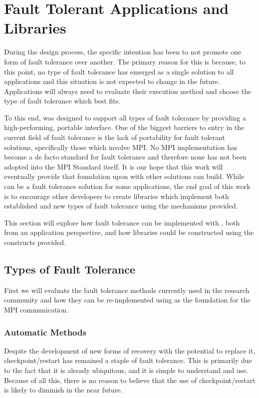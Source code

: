 \chapter{Fault Tolerant Applications and Libraries}
\label{chap:apps}

During the \ulfm design process, the specific intention has been to not promote 
one form of fault tolerance over another. The primary reason for this is because, to 
this point, no type of fault tolerance has emerged as a single solution to all 
applications and this situation is not expected to change in the future. Applications 
will always need to evaluate their execution method and choose the type of fault 
tolerance which best fits.

To this end, \ulfm was designed to support all types of fault tolerance by 
providing a high-performing, portable interface. One of the biggest barriers to 
entry in the current field of fault tolerance is the lack of portability for 
fault tolerant solutions, specifically those which involve MPI. No MPI 
implementation has become a de facto standard for fault tolerance and therefore 
none has not been adopted into the MPI Standard itself. It is our hope that this work 
will eventually provide that foundation upon with other solutions can build. While 
\ulfm can be a fault tolerance solution for some applications, the end goal of 
this work is to encourage other developers to create libraries which implement 
both established and new types of fault tolerance using the mechanisms provided.

This section will explore how fault tolerance can be implemented with \ulfm, both from an application perspective, and how libraries could be constructed using the constructs provided.

\section{Types of Fault Tolerance}
\label{sec:apps:types}

First we will evaluate the fault tolerance methods currently used in the research 
community and how they can be re-implemented using \ulfm as the foundation for 
the MPI communication.

\subsection{Automatic Methods}
\label{subsec:apps:types:auto}

Despite the development of new forms of recovery with the potential to 
replace it, checkpoint/restart has remained a staple of fault tolerance. This is 
primarily due to the fact that it is already ubiquitous, and it is simple to 
understand and use. Because of all this, there is no reason to believe that the 
use of checkpoint/restart is likely to diminish in the near future.

